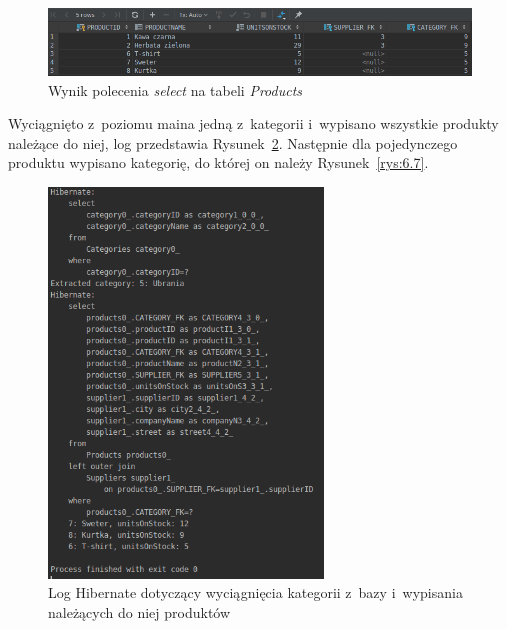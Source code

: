 \documentclass[12pt, a4paper]{mwart}
\begin{document}
\begin{figure}[ht]
  \centering
  \includegraphics[scale=0.5]{VI/6-3.png}
  \caption{Wynik polecenia \textit{select} na tabeli \textit{Products}}
  \label{rys:6.3}
\end{figure}

Wyciągnięto z~poziomu maina jedną z~kategorii i~wypisano wszystkie produkty należące do niej, log przedstawia Rysunek~\ref{rys:6.6}. Następnie dla pojedynczego produktu wypisano kategorię, do której on należy \ppauza Rysunek~\ref{rys:6.7}.

\begin{figure}[ht]
  \centering
  \includegraphics[width=0.65\textwidth]{VI/6-6.png}
  \caption{Log Hibernate dotyczący wyciągnięcia kategorii z~bazy i~wypisania należących do niej produktów}
  \label{rys:6.6}
\end{figure}
\end{document}
